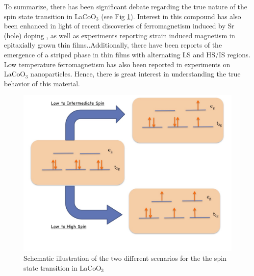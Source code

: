 \documentclass[10pt]{ruthesis}
\begin{document}
{To summarize, there has been significant debate regarding the true nature of the spin state transition in LaCoO$_3$ (see Fig \ref{Transition}). Interest in this compound has also been enhanced in light of recent discoveries of ferromagnetism induced by Sr (hole) doping \cite{Kriener, Masayuki, Kunes_doped,nemeth}, as well as experiments reporting strain induced magnetism in epitaxially grown thin films.\cite{Fuchs1, Fuchs2, Rondinelli, Freeland, Fuchs3, Herklotz,Hsu}.Additionally, there have been reports of the emergence of a striped phase in thin films with alternating LS and HS/IS regions.\cite{Striped}   Low temperature ferromagnetism has also been reported in experiments on LaCoO$_3$ nanoparticles\cite{Belanger1}. Hence, there is great interest in understanding the true behavior of this material. 

 \begin{figure}[H]
 \begin{center}
 \includegraphics[width=\columnwidth]{Transition_figure.jpg}
 \caption{Schematic illustration of the two different scenarios for the the spin state transition in LaCoO$_3$ }
\label{Transition}
 \end{center}
 \end{figure}
 
}
\end{document}
